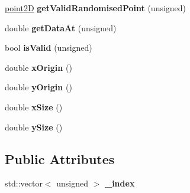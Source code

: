 \begin{DoxyCompactItemize}
\mbox{\hyperlink{classpoint2D}{point2D}} {\bfseries get\+Valid\+Randomised\+Point} (unsigned)
\item 
\mbox{\label{classasciiGrid_add163ffae683376f280c2213ff934bbb}} 
double {\bfseries get\+Data\+At} (unsigned)
\item 
\mbox{\label{classasciiGrid_a105a28e8ffea13d3028056d96fff635f}} 
bool {\bfseries is\+Valid} (unsigned)
\item 
\mbox{\label{classasciiGrid_ab8ed7fabf5543d2a67a91625d27fc09b}} 
double {\bfseries x\+Origin} ()
\item 
\mbox{\label{classasciiGrid_a11da6bbac5ded2d9ada9f135268bc6d2}} 
double {\bfseries y\+Origin} ()
\item 
\mbox{\label{classasciiGrid_a50fc35c27a953963fb5ce7e648b2362e}} 
double {\bfseries x\+Size} ()
\item 
\mbox{\label{classasciiGrid_a9959f994fa19b93fc7d2185ea162e979}} 
double {\bfseries y\+Size} ()
\end{DoxyCompactItemize}
\subsection*{Public Attributes}
\begin{DoxyCompactItemize}
\item 
\mbox{\label{classasciiGrid_a061a3c19021ec5df0132375100106918}} 
std\+::vector$<$ unsigned $>$ {\bfseries \+\_\+index}
\end{DoxyCompactItemize}
